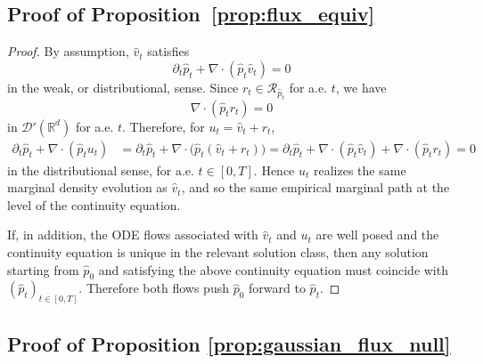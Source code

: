 \documentclass[a4paper,11pt]{article}
\theoremstyle{plain}
\theoremstyle{definition}
\begin{document}
\subsection{Proof of Proposition~\ref{prop:flux_equiv}}

\begin{proof}
By assumption, \(\hat v_t\) satisfies
\[
    \partial_t\hat p_t+\nabla\cdot(\hat p_t\hat v_t)=0
\]
in the weak, or distributional, sense. Since \(r_t\in\mathcal R_{\hat p_t}\)
for a.e. \(t\), we have
\[
    \nabla\cdot(\hat p_t r_t)=0
\]
in \(\mathcal D'(\mathbb R^d)\) for a.e. \(t\). Therefore, for
\(u_t=\hat v_t+r_t\),
\[
\begin{aligned}
    \partial_t\hat p_t+\nabla\cdot(\hat p_tu_t)
    &=
    \partial_t\hat p_t+\nabla\cdot\bigl(\hat p_t(\hat v_t+r_t)\bigr) =
    \partial_t\hat p_t+\nabla\cdot(\hat p_t\hat v_t)
    +
    \nabla\cdot(\hat p_t r_t) 
    =0
\end{aligned}
\]
in the distributional sense, for a.e. \(t\in[0,T]\). Hence \(u_t\) realizes
the same marginal density evolution as \(\hat v_t\), and so the same empirical marginal
path at the level of the continuity equation.

If, in addition, the ODE flows associated with \(\hat v_t\) and \(u_t\) are
well posed and the continuity equation is unique in the relevant solution
class, then any solution starting from \(\hat p_0\) and satisfying the above
continuity equation must coincide with \((\hat p_t)_{t\in[0,T]}\). Therefore
both flows push \(\hat p_0\) forward to \(\hat p_t\).
\end{proof}

\subsection{Proof of Proposition \ref{prop:gaussian_flux_null}}
\end{document}
